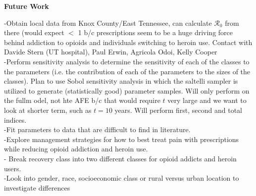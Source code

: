\documentclass[12pt]{article}
\begin{document}
\textbf{Future Work} 


-Obtain local data from Knox County/East Tennessee, can calculate $\mathscr{R}_0$ from there (would expect $<$ 1 b/c prescriptions seem to be a huge driving force behind addiction to opioids and individuals switching to heroin use. Contact with Davide Stern (UT hospital), Paul Erwin, Agricola Odoi, Kelly Cooper\\
-Perform sensitivity analysis to determine the sensitivity of each of the classes to the parameters (i.e. the contribution of each of the parameters to the sizes of the classes). Plan to use Sobol sensitivity analysis in which the saltelli sampler is utilized to generate (statistically good) parameter samples. Will only perform on the fullm odel, not hte AFE b/c that would require $t$ very large and we want to look at shorter term, such as $t=10$ years. Will perform first, second and total indices. \\
-Fit parameters to data that are difficult to find in literature. \\
-Explore management strategies for how to best treat pain with prescriptions while reducing opioid addiction and heroin use.  \\
- Break recovery class into two different classes for opioid addicts and heroin users. \\
-Look into gender, race, socioeconomic class or rural versus urban location to investigate differences%





\pagebreak


\end{document}
